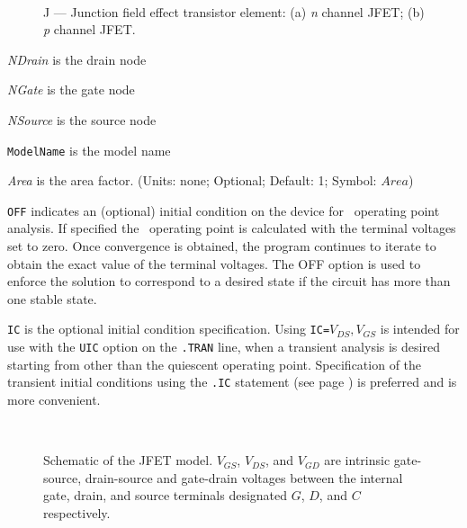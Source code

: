 \begin{figure}[h]
\centering
\ 
\caption[J --- Junction field effect transistor element]{J --- Junction field effect
transistor element: (a) {\it n} channel JFET; (b) {\it p} channel JFET.\label{j.ps}}
\end{figure}



\begin{widelist}
\item[{\it NDrain}] is the drain node
\item[{\it NGate}] is the gate node
\item[{\it NSource}] is the source node
\item[{\tt ModelName}]  is  the  model name
\item[{\it Area}] is the area factor.
               (Units: none; Optional; Default: 1; Symbol: $Area$)
\item[{\tt OFF}] indicates an (optional) initial condition on the device for
\dc\ operating point analysis.
If specified the \dc\ operating point is calculated with the terminal voltages
set to zero.  Once convergence is obtained, the
program continues to iterate to obtain the exact  value of
the  terminal  voltages.  The OFF option is used to enforce the solution
to  correspond  to  a  desired  state if the circuit has more than one stable
state.
\item[{\tt IC}] is the optional  initial condition specification.
Using {\tt IC=}$V_{DS},V_{GS}$
is intended for use with the {\tt UIC} option
on  the  {\tt .TRAN}  line,  when  a transient analysis is desired
starting from other than the quiescent operating point.
Specification of the transient initial conditions using the {\tt .IC}
statement (see page \pageref{.ICstatement}) is preferred and is more
convenient.
\end{widelist}

\begin{figure}[h]
\centering
\ \epsfxsize=2.75in
\caption[Schematic of the JFET model]{Schematic of the JFET model. \label{jfet}
$V_{GS}$, $V_{DS}$, and $V_{GD}$ are intrinsic gate-source,
drain-source and gate-drain voltages
between the internal gate, drain, and source terminals designated
$G$, $D$, and $C$ respectively.  }
\end{figure}

